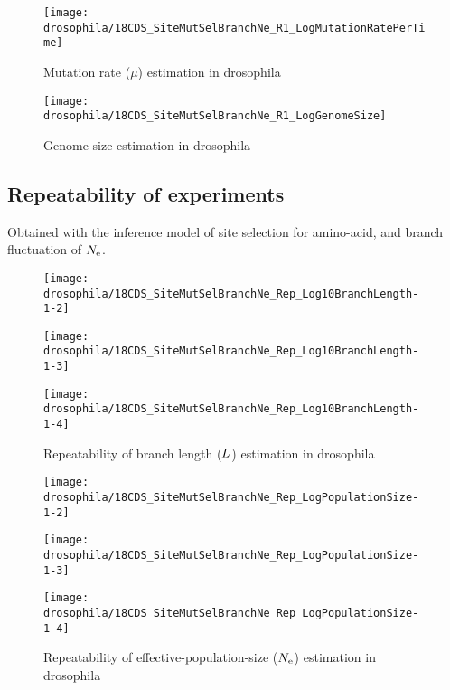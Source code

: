 \begin{figure}[H]
    \centering
    \texttt{[image: drosophila/18CDS\_SiteMutSelBranchNe\_R1\_LogMutationRatePerTime]}
    \caption[Mutation rate estimation in drosophila]{Mutation rate ($\mu$) estimation in drosophila}
\end{figure}

\begin{figure}[H]
    \centering
    \texttt{[image: drosophila/18CDS\_SiteMutSelBranchNe\_R1\_LogGenomeSize]}
    \caption[Genome size estimation in drosophila]{Genome size estimation in drosophila}
\end{figure}

\subsection{Repeatability of experiments}
Obtained with the inference model of site selection for amino-acid, and branch fluctuation of $N_{\mathrm{e}}$.

\begin{figure}[H]
    \centering
    \begin{minipage}{0.32\linewidth}
        \texttt{[image: drosophila/18CDS\_SiteMutSelBranchNe\_Rep\_Log10BranchLength-1-2]}
    \end{minipage} \hfill
    \begin{minipage}{0.32\linewidth}
        \texttt{[image: drosophila/18CDS\_SiteMutSelBranchNe\_Rep\_Log10BranchLength-1-3]}
    \end{minipage} \hfill
    \begin{minipage}{0.32\linewidth}
        \texttt{[image: drosophila/18CDS\_SiteMutSelBranchNe\_Rep\_Log10BranchLength-1-4]}
    \end{minipage}
    \caption[Repeatability of branch length estimation in drosophila]{Repeatability of branch length ($L$) estimation in drosophila}
\end{figure}

\begin{figure}[H]
    \centering
    \begin{minipage}{0.32\linewidth}
        \texttt{[image: drosophila/18CDS\_SiteMutSelBranchNe\_Rep\_LogPopulationSize-1-2]}
    \end{minipage} \hfill
    \begin{minipage}{0.32\linewidth}
        \texttt{[image: drosophila/18CDS\_SiteMutSelBranchNe\_Rep\_LogPopulationSize-1-3]}
    \end{minipage} \hfill
    \begin{minipage}{0.32\linewidth}
        \texttt{[image: drosophila/18CDS\_SiteMutSelBranchNe\_Rep\_LogPopulationSize-1-4]}
    \end{minipage}
    \caption[Repeatability of \gls{effective-population-size} estimation in drosophila]{Repeatability of \gls{effective-population-size} ($N_{\mathrm{e}}$) estimation in drosophila}
\end{figure}

